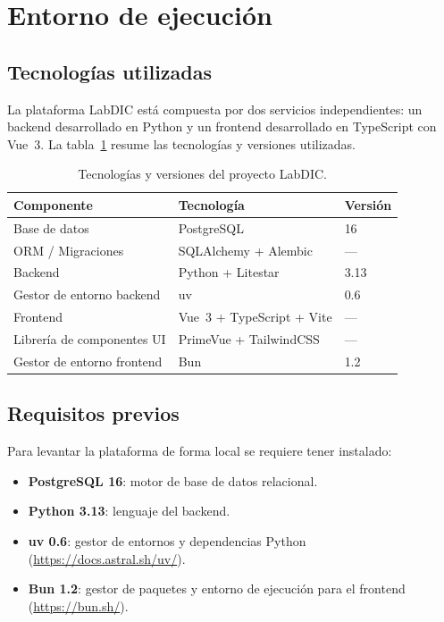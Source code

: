 \section{Entorno de ejecución}\label{sec:entorno_ejecucion}

\subsection*{Tecnologías utilizadas}

La plataforma LabDIC está compuesta por dos servicios independientes: un backend desarrollado
en Python y un frontend desarrollado en TypeScript con Vue~3. La tabla~\ref{tab:tecnologias}
resume las tecnologías y versiones utilizadas.

\begin{table}[H]
	\centering
	\begin{tabular}{lll}
		\hline
		\textbf{Componente}        & \textbf{Tecnología}              & \textbf{Versión} \\
		\hline
		Base de datos              & PostgreSQL                       & 16               \\
		ORM / Migraciones          & SQLAlchemy + Alembic             & —                \\
		Backend                    & Python + Litestar                & 3.13             \\
		Gestor de entorno backend  & uv                               & 0.6              \\
		Frontend                   & Vue~3 + TypeScript + Vite        & —                \\
		Librería de componentes UI & PrimeVue + TailwindCSS           & —                \\
		Gestor de entorno frontend & Bun                              & 1.2              \\
		\hline
	\end{tabular}
	\caption{Tecnologías y versiones del proyecto LabDIC.}
	\label{tab:tecnologias}
\end{table}

\subsection*{Requisitos previos}

Para levantar la plataforma de forma local se requiere tener instalado:

\begin{itemize}
	\item \textbf{PostgreSQL 16}: motor de base de datos relacional.
	\item \textbf{Python 3.13}: lenguaje del backend.
	\item \textbf{uv 0.6}: gestor de entornos y dependencias Python (\url{https://docs.astral.sh/uv/}).
	\item \textbf{Bun 1.2}: gestor de paquetes y entorno de ejecución para el frontend (\url{https://bun.sh/}).
\end{itemize}

